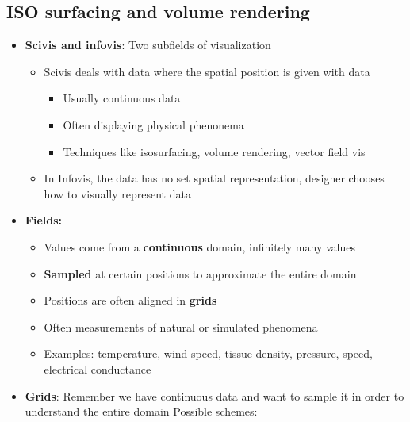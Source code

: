 \documentclass{report}
\begin{document}
    \pagebreak 
    \subsection{ISO surfacing and volume rendering}
    \begin{itemize}
        \item \textbf{Scivis and infovis}: Two subfields of visualization 
            \begin{itemize}
                \item Scivis deals with data where the spatial position is given with data
                    \begin{itemize}
                        \item Usually continuous data
                        \item Often displaying physical phenonema
                        \item Techniques like isosurfacing, volume rendering, vector field vis
                    \end{itemize}
                \item In Infovis, the data has no set spatial representation, designer chooses how to visually represent data
            \end{itemize}
        \item \textbf{Fields:} 
            \begin{itemize}
                \item Values come from a \textbf{continuous} domain, infinitely many values
                \item \textbf{Sampled} at certain positions to approximate the entire domain
                \item Positions are often aligned in \textbf{grids}
                \item Often measurements of natural or simulated phenomena
                \item Examples: temperature, wind speed, tissue density, pressure, speed, electrical conductance
            \end{itemize}
        \item \textbf{Grids}: Remember we have continuous data and want to sample it in order to understand the entire domain
            \bigbreak \noindent 
            Possible schemes:
            \bigbreak \noindent 
            \bigbreak \noindent 
            \begin{itemize}

\end{itemize}
\end{itemize}
\end{document}
